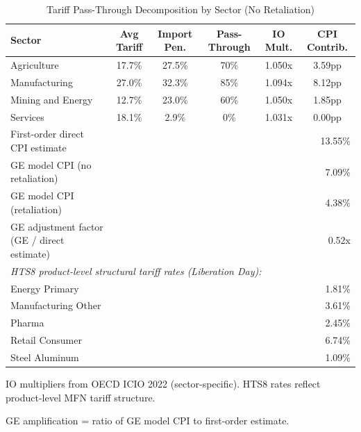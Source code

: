 \begin{table}[H]
\centering
\caption{Tariff Pass-Through Decomposition by Sector (No Retaliation)}
\label{tab:retail_passthrough}
\begin{tabular}{lccccc}
\toprule
Sector & Avg Tariff & Import Pen. & Pass-Through & IO Mult. & CPI Contrib. \\
\midrule
Agriculture & 17.7\% & 27.5\% & 70\% & 1.050x & 3.59pp \\
Manufacturing & 27.0\% & 32.3\% & 85\% & 1.094x & 8.12pp \\
Mining and Energy & 12.7\% & 23.0\% & 60\% & 1.050x & 1.85pp \\
Services & 18.1\% & 2.9\% & 0\% & 1.031x & 0.00pp \\
\midrule
First-order direct CPI estimate & \multicolumn{5}{r}{13.55\%} \\
GE model CPI (no retaliation) & \multicolumn{5}{r}{7.09\%} \\
GE model CPI (retaliation) & \multicolumn{5}{r}{4.38\%} \\
GE adjustment factor (GE / direct estimate) & \multicolumn{5}{r}{0.52x} \\
\midrule
\multicolumn{6}{l}{\textit{HTS8 product-level structural tariff rates (Liberation Day):}} \\
\quad Energy Primary & \multicolumn{5}{r}{1.81\%} \\
\quad Manufacturing Other & \multicolumn{5}{r}{3.61\%} \\
\quad Pharma & \multicolumn{5}{r}{2.45\%} \\
\quad Retail Consumer & \multicolumn{5}{r}{6.74\%} \\
\quad Steel Aluminum & \multicolumn{5}{r}{1.09\%} \\
\bottomrule
\end{tabular}
\begin{tablenotes}
\small
\item IO multipliers from OECD ICIO 2022 (sector-specific). HTS8 rates reflect product-level MFN tariff structure.
\item GE amplification = ratio of GE model CPI to first-order estimate.
\end{tablenotes}
\end{table}